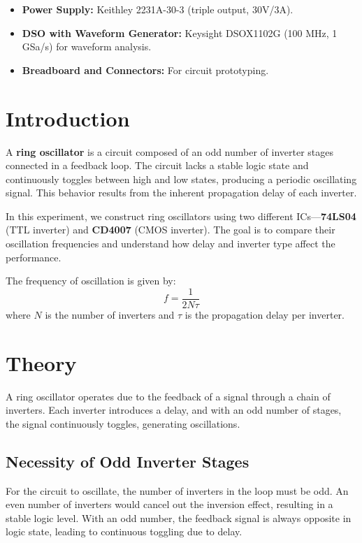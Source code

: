 \documentclass[conference]{IEEEtran}
\begin{document}
\begin{itemize}
    \item \textbf{Power Supply:} Keithley 2231A-30-3 (triple output, 30V/3A).

    \item \textbf{DSO with Waveform Generator:} Keysight DSOX1102G (100 MHz, 1 GSa/s) for waveform analysis.

    \item \textbf{Breadboard and Connectors:} For circuit prototyping.
    
\end{itemize}


\section{Introduction}
\noindent A \textbf{ring oscillator} is a circuit composed of an odd number of inverter stages connected in a feedback loop. The circuit lacks a stable logic state and continuously toggles between high and low states, producing a periodic oscillating signal. This behavior results from the inherent propagation delay of each inverter.

\noindent In this experiment, we construct ring oscillators using two different ICs—\textbf{74LS04} (TTL inverter) and \textbf{CD4007} (CMOS inverter). The goal is to compare their oscillation frequencies and understand how delay and inverter type affect the performance.

\noindent The frequency of oscillation is given by:
\begin{equation}
f = \frac{1}{2N\tau}
\end{equation}
where $N$ is the number of inverters and $\tau$ is the propagation delay per inverter.

\section{Theory}
\noindent A ring oscillator operates due to the feedback of a signal through a chain of inverters. Each inverter introduces a delay, and with an odd number of stages, the signal continuously toggles, generating oscillations.

\subsection{Necessity of Odd Inverter Stages}
\noindent For the circuit to oscillate, the number of inverters in the loop must be odd. An even number of inverters would cancel out the inversion effect, resulting in a stable logic level. With an odd number, the feedback signal is always opposite in logic state, leading to continuous toggling due to delay.
\end{document}
